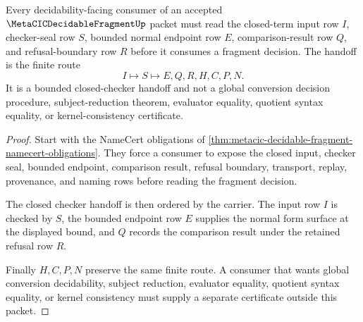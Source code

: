 \begin{theorem}
\label{thm:metacic-decidable-fragment-closed-checker-handoff}
Every decidability-facing consumer of an accepted $\MetaCICDecidableFragmentUp$ packet must read the closed-term input row $I$, checker-seal row $S$, bounded normal endpoint row $E$, comparison-result row $Q$, and refusal-boundary row $R$ before it consumes a fragment decision. The handoff is the finite route
$$
I \longmapsto S \longmapsto E,Q,R,H,C,P,N .
$$
It is a bounded closed-checker handoff and not a global conversion decision procedure, subject-reduction theorem, evaluator equality, quotient syntax equality, or kernel-consistency certificate.
\end{theorem}
\begin{proof}
Start with the NameCert obligations of \autoref{thm:metacic-decidable-fragment-namecert-obligations}. They force a consumer to expose the closed input, checker seal, bounded endpoint, comparison result, refusal boundary, transport, replay, provenance, and naming rows before reading the fragment decision.

The closed checker handoff is then ordered by the carrier. The input row $I$ is checked by $S$, the bounded endpoint row $E$ supplies the normal form surface at the displayed bound, and $Q$ records the comparison result under the retained refusal row $R$.

Finally $H,C,P,N$ preserve the same finite route. A consumer that wants global conversion decidability, subject reduction, evaluator equality, quotient syntax equality, or kernel consistency must supply a separate certificate outside this packet.
\end{proof}

